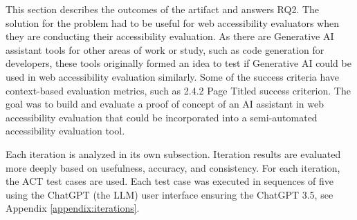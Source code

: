 This section describes the outcomes of the artifact and answers RQ2. The solution for the problem had to be useful for web accessibility evaluators when they are conducting their accessibility evaluation. As there are Generative AI assistant tools for other areas of work or study, such as code generation for developers, these tools originally formed an idea to test if Generative AI could be used in web accessibility evaluation similarly. Some of the success criteria have context-based evaluation metrics, such as 2.4.2 Page Titled success criterion. The goal was to build and evaluate a proof of concept of an AI assistant in web accessibility evaluation that could be incorporated into a semi-automated accessibility evaluation tool.

Each iteration is analyzed in its own subsection. Iteration results are evaluated more deeply based on usefulness, accuracy, and consistency. For each iteration, the \textcite{act_rule_g88} ACT test cases are used. Each test case was executed in sequences of five using the ChatGPT (the LLM) user interface ensuring the ChatGPT 3.5, see Appendix \ref{appendix:iterations}. 


